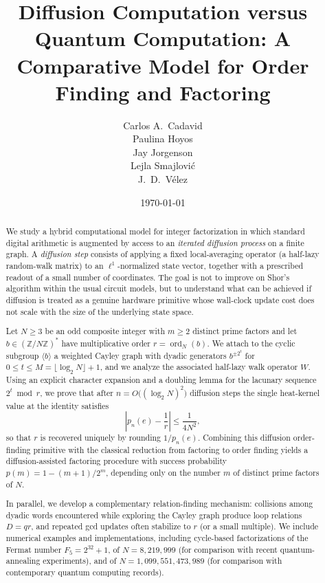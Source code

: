 \documentclass[11pt,reqno]{article}
\title{Diffusion Computation versus Quantum Computation: A Comparative Model for Order Finding and Factoring}
\author{
Carlos A.\ Cadavid\\
Paulina Hoyos\\
Jay Jorgenson\\
Lejla Smajlovi\'c\\
J.\ D.\ V\'elez\\
}
\date{\today}
\numberwithin{equation}{section}
\DeclareMathOperator{\ord}{ord}
\theoremstyle{plain}
\theoremstyle{definition}
\theoremstyle{remark}
\begin{document}
\maketitle


\begin{abstract}\noindent
We study a hybrid computational model for integer factorization in which standard digital arithmetic
is augmented by access to an \emph{iterated diffusion process} on a finite graph.  A \emph{diffusion step}
consists of applying a fixed local-averaging operator (a half-lazy random-walk matrix) to an
$\ell^{1}$-normalized state vector, together with a prescribed readout of a small number of
coordinates.  The goal is not to improve on Shor’s algorithm within the usual circuit models, but to
understand what can be achieved if diffusion is treated as a genuine hardware primitive whose
wall-clock update cost does not scale with the size of the underlying state space.

Let $N\ge 3$ be an odd composite integer with $m\geq 2$ distinct prime factors and let $b\in(\mathbb Z/N\mathbb Z)^{\ast}$ have multiplicative
order $r=\ord_N(b)$.  We attach to the cyclic subgroup $\langle b\rangle$ a weighted Cayley graph with
dyadic generators $b^{\pm 2^t}$ for $0\le t\le M=\lfloor \log_2 N\rfloor+1$, and we analyze the associated
half-lazy walk operator $W$.  Using an explicit character expansion and a doubling lemma for the
lacunary sequence $2^t\bmod r$, we prove that after $
n=O\bigl((\log_2 N)^2\bigr)
$
diffusion steps the single heat-kernel value at the identity satisfies
\[
\left|p_n(e)-\frac{1}{r}\right|\le \frac{1}{4N^2},
\]
so that $r$ is recovered uniquely by rounding $1/p_n(e)$.  Combining this diffusion order-finding
primitive with the classical reduction from factoring to order finding
yields a diffusion-assisted factoring procedure with success probability
$p(m)=1-(m+1)/2^{m}$, depending only on the number $m$ of distinct prime factors of $N$.

In parallel, we develop a complementary relation-finding mechanism: collisions among
dyadic words encountered while exploring the Cayley graph produce loop relations $D=qr$, and repeated gcd updates often stabilize to $r$ (or a small multiple). %
We include numerical examples and implementations, including cycle-based factorizations of the Fermat number
$F_5=2^{32}+1$, of $N=8{,}219{,}999$ (for comparison with recent quantum-annealing experiments),
and of $N=1{,}099{,}551{,}473{,}989$ (for comparison with contemporary quantum computing records).
\end{abstract}
\end{document}

